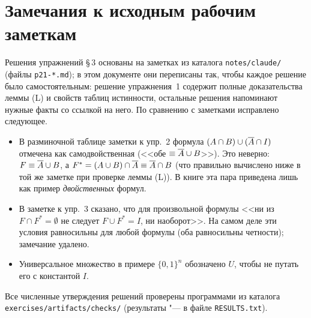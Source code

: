 \section*{Замечания к исходным рабочим заметкам}
Решения упражнений \S\,3 основаны на заметках из каталога
\texttt{notes/claude/} (файлы \texttt{p21-*.md}); в этом документе они
переписаны так, чтобы каждое решение было самостоятельным: решение
упражнения~1 содержит полные доказательства леммы (L) и свойств таблиц
истинности, остальные решения напоминают нужные факты со ссылкой на него.
По сравнению с заметками исправлено следующее.
\begin{itemize}
\item В разминочной таблице заметки к упр.~2 формула
  $(A\cap B)\cup(\overline{A}\cap I)$ отмечена как самодвойственная (<<обе
  $\equiv\overline{A}\cup B$>>). Это неверно: $F\equiv\overline{A}\cup B$, а
  $F^*=(A\cup B)\cap\overline{A}\equiv\overline{A}\cap B$ (что правильно вычислено ниже
  в той же заметке при проверке леммы (L)). В книге эта пара приведена лишь
  как пример \emph{двойственных} формул.
\item В заметке к упр.~3 сказано, что для произвольной формулы <<ни из
  $F\cap F^*=\emptyset$ не следует $F\cup F^*=I$, ни наоборот>>. На самом
  деле эти условия равносильны для любой формулы (оба равносильны
  четности); замечание удалено.
\item Универсальное множество в примере $\{0,1\}^n$ обозначено $U$, чтобы не
  путать его с константой $I$.
\end{itemize}
Все численные утверждения решений проверены программами из каталога
\texttt{exercises/artifacts/checks/} (результаты "--- в файле
\texttt{RESULTS.txt}).

